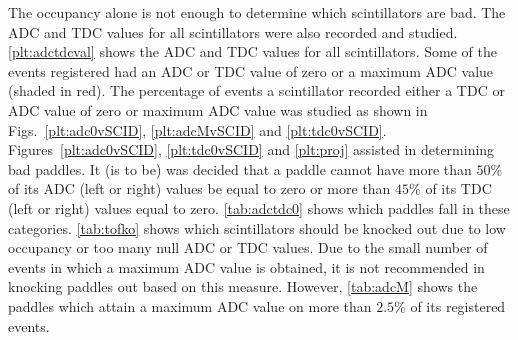 The occupancy alone is not enough to determine which scintillators are bad. The ADC and TDC values for all scintillators were also recorded and studied. \ref{plt:adctdcval} shows the ADC and TDC values for all scintillators. Some of the events registered had an ADC or TDC value of zero or a maximum ADC value (shaded in red). The percentage of events a scintillator recorded either a TDC or ADC value of zero or maximum ADC value was studied as shown in Figs.~\ref{plt:adc0vSCID}, \ref{plt:adcMvSCID} and \ref{plt:tdc0vSCID}. Figures~\ref{plt:adc0vSCID}, \ref{plt:tdc0vSCID} and \ref{plt:proj} assisted in determining bad paddles. It (is to be) was decided that a paddle cannot have more than $50\%$ of its ADC (left or right) values be equal to zero or more than $45\%$ of its TDC (left or right) values equal to zero. \ref{tab:adctdc0} shows which paddles fall in these categories. \ref{tab:tofko} shows which scintillators should be knocked out due to low occupancy or too many null ADC or TDC values. Due to the small number of events in which a maximum ADC value is obtained, it is not recommended in knocking paddles out based on this measure. However, \ref{tab:adcM} shows the paddles which attain a maximum ADC value on more than $2.5\%$ of its registered events.





